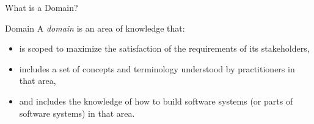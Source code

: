 \begin{frame}{What is a Domain?}
	\begin{fancycolumns}[animation=none]
		\begin{definition}{Domain  } %
			\mycitebegin A \emph{domain} is an area of knowledge that:
			\begin{itemize}
				\item is scoped to maximize the satisfaction of the requirements of its stakeholders,
				\item includes a set of concepts and terminology understood by practitioners in that area,
				\item and includes the knowledge of how to build software systems (or parts of
				software systems) in that area.\myciteend
			\end{itemize}
		\end{definition}
	\nextcolumn

		\hfill{}\hfill{}

		\hfill{}
	\end{fancycolumns}
\end{frame}

